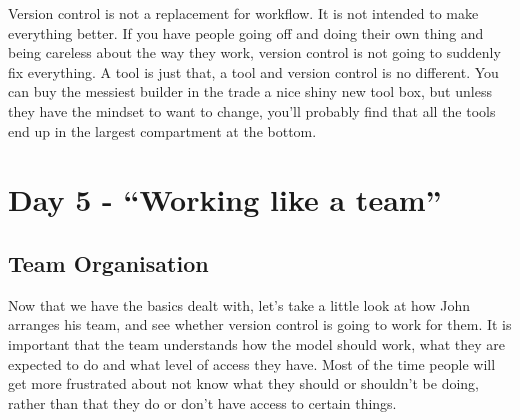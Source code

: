 Version control is not a replacement for workflow.  It is not intended to make everything better.  If you have people going off and doing their own thing and being careless about the way they work, version control is not going to suddenly fix everything.  A tool is just that, a tool and version control is no different.  You can buy the messiest builder in the trade a nice shiny new tool box, but unless they have the mindset to want to change, you'll probably find that all the tools end up in the largest compartment at the bottom.

\section{Day 5 - ``Working like a team''}

\subsection{Team Organisation}

Now that we have the basics dealt with, let's take a little look at how John arranges his team, and see whether version control is going to work for them.  It is important that the team understands how the model should work, what they are expected to do and what level of access they have.  Most of the time people will get more frustrated about not know what they should or shouldn't be doing, rather than that they do or don't have access to certain things.

